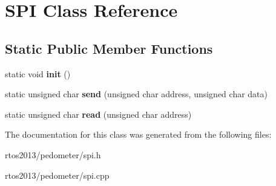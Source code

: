 \hypertarget{classSPI}{\section{S\+P\+I Class Reference}
\label{classSPI}
}
\subsection*{Static Public Member Functions}
\begin{DoxyCompactItemize}
\item 
\hypertarget{classSPI_a60cff52f775b82a444dcab1424ae7559}{static void {\bfseries init} ()}\label{classSPI_a60cff52f775b82a444dcab1424ae7559}

\item 
\hypertarget{classSPI_ada5e442f8af2589e665cf9fc5ca2ea3b}{static unsigned char {\bfseries send} (unsigned char address, unsigned char data)}\label{classSPI_ada5e442f8af2589e665cf9fc5ca2ea3b}

\item 
\hypertarget{classSPI_a30fa5b93728ebc46a2b4b2a3f87e6c02}{static unsigned char {\bfseries read} (unsigned char address)}\label{classSPI_a30fa5b93728ebc46a2b4b2a3f87e6c02}

\end{DoxyCompactItemize}


The documentation for this class was generated from the following files\+:\begin{DoxyCompactItemize}
\item 
rtos2013/pedometer/spi.\+h\item 
rtos2013/pedometer/spi.\+cpp\end{DoxyCompactItemize}
